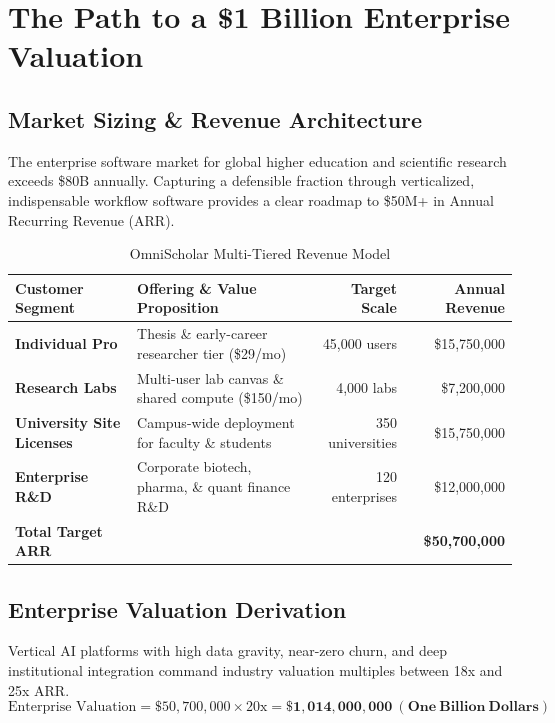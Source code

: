 \documentclass[11pt,a4paper]{article}
\begin{document}
\section{The Path to a \$1 Billion Enterprise Valuation}

\subsection{Market Sizing \& Revenue Architecture}
The enterprise software market for global higher education and scientific research exceeds \$80B annually. Capturing a defensible fraction through verticalized, indispensable workflow software provides a clear roadmap to \$50M+ in Annual Recurring Revenue (ARR).

\vspace{1em}

\begin{table}[h!]
\centering
\caption{OmniScholar Multi-Tiered Revenue Model}
\vspace{0.5em}
\begin{tabularx}{\textwidth}{lXrr}
\toprule
\textbf{Customer Segment} & \textbf{Offering \& Value Proposition} & \textbf{Target Scale} & \textbf{Annual Revenue} \\
\midrule
\textbf{Individual Pro} & Thesis \& early-career researcher tier (\$29/mo) & 45,000 users & \$15,750,000 \\
\textbf{Research Labs} & Multi-user lab canvas \& shared compute (\$150/mo) & 4,000 labs & \$7,200,000 \\
\textbf{University Site Licenses} & Campus-wide deployment for faculty \& students & 350 universities & \$15,750,000 \\
\textbf{Enterprise R\&D} & Corporate biotech, pharma, \& quant finance R\&D & 120 enterprises & \$12,000,000 \\
\midrule
\textbf{Total Target ARR} & & & \textbf{\$50,700,000} \\
\bottomrule
\end{tabularx}
\end{table}

\vspace{1em}

\subsection{Enterprise Valuation Derivation}
Vertical AI platforms with high data gravity, near-zero churn, and deep institutional integration command industry valuation multiples between 18x and 25x ARR.
$$\text{Enterprise Valuation} = \$50,700,000 \times 20\text{x} = \mathbf{\$1,014,000,000\ (One\ Billion\ Dollars)}$$
\end{document}
